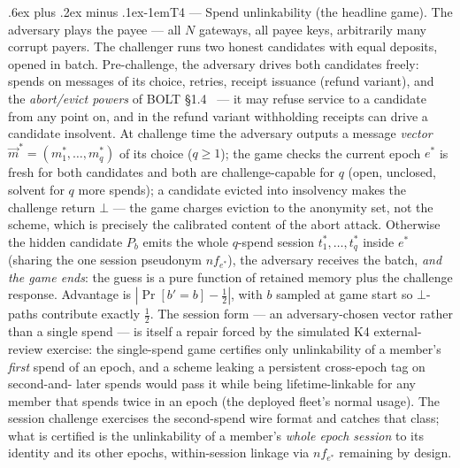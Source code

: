 \documentclass[9pt]{extarticle}
\makeatletter
\renewcommand\paragraph{\@startsection{paragraph}{4}{0pt}%
  {.6ex plus .2ex minus .1ex}{-1em}{\normalfont\normalsize\bfseries}}
\makeatother
\begin{document}
\paragraph{T4 --- Spend unlinkability (the headline game).} The adversary
plays the payee --- all $N$ gateways, all payee keys, arbitrarily many
corrupt payers. The challenger runs two honest candidates with equal
deposits, opened in batch. Pre-challenge, the adversary drives both
candidates freely: spends on messages of its choice, retries, receipt
issuance (refund variant), and the \emph{abort/evict powers} of BOLT
\S1.4~\cite{greenmiers2017bolt} --- it may refuse service to a candidate
from any point on, and in the refund variant withholding receipts can
drive a candidate insolvent. At challenge time the adversary outputs a
message \emph{vector} $\vec{m}^* = (m^*_1, \ldots, m^*_q)$ of its choice
($q \ge 1$); the game checks the current epoch $e^*$ is fresh for both
candidates and both are challenge-capable for $q$ (open, unclosed, solvent
for $q$ more spends); a candidate evicted into insolvency makes the
challenge return $\bot$ --- the game charges eviction to the anonymity set,
not the scheme, which is precisely the calibrated content of the abort
attack. Otherwise the hidden candidate $P_b$ emits the whole
$q$-spend session $t^*_1, \ldots, t^*_q$ inside $e^*$ (sharing the one
session pseudonym $nf_{e^*}$), the adversary receives the batch,
\emph{and the game ends}: the guess is a pure function of retained memory
plus the challenge response. Advantage is $|\Pr[b' = b] - \tfrac12|$, with
$b$ sampled at game start so $\bot$-paths contribute exactly $\tfrac12$.
The session form --- an adversary-chosen vector rather than a single
spend --- is itself a repair forced by the simulated K4 external-review
exercise: the single-spend
game certifies only unlinkability of a member's \emph{first} spend of an
epoch, and a scheme leaking a persistent cross-epoch tag on second-and-
later spends would pass it while being lifetime-linkable for any member
that spends twice in an epoch (the deployed fleet's normal usage). The
session challenge exercises the second-spend wire format and catches that
class; what is certified is the unlinkability of a member's \emph{whole
epoch session} to its identity and its other epochs, within-session
linkage via $nf_{e^*}$ remaining by design.
\end{document}

